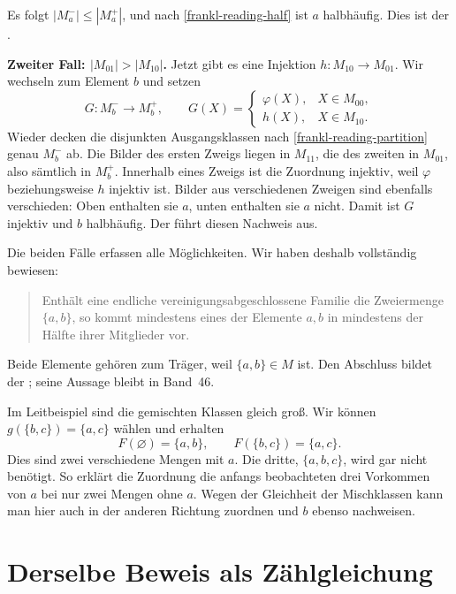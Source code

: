 Es folgt \(|M_a^-|\leq|M_a^+|\), und nach
\eqref{frankl-reading-half} ist \(a\) halbhäufig.
Dies ist der .

\medskip\noindent\textbf{Zweiter Fall: \(|M_{01}|>|M_{10}|\).}
Jetzt gibt es eine Injektion
\(h\colon M_{10}\to M_{01}\). Wir wechseln zum Element
\(b\) und setzen
\[
  G\colon M_b^-\longrightarrow M_b^+,
  \qquad
  G(X)=
  \begin{cases}
    \varphi(X),&X\in M_{00},\\
    h(X),&X\in M_{10}.
  \end{cases}
\]
Wieder decken die disjunkten Ausgangsklassen nach
\eqref{frankl-reading-partition} genau \(M_b^-\) ab.
Die Bilder des ersten Zweigs liegen in \(M_{11}\), die
des zweiten in \(M_{01}\), also sämtlich in \(M_b^+\).
Innerhalb eines Zweigs ist die Zuordnung injektiv, weil
\(\varphi\) beziehungsweise \(h\) injektiv ist.
Bilder aus verschiedenen Zweigen sind ebenfalls verschieden:
Oben enthalten sie \(a\), unten enthalten sie \(a\) nicht.
Damit ist \(G\) injektiv und \(b\) halbhäufig.
Der 
führt diesen Nachweis aus.

Die beiden Fälle erfassen alle Möglichkeiten. Wir haben
deshalb vollständig bewiesen:
\hypertarget{frankl.reading.pair}{}
\begin{quote}
  Enthält eine endliche vereinigungsabgeschlossene Familie
  die Zweiermenge \(\{a,b\}\), so kommt mindestens eines
  der Elemente \(a,b\) in mindestens der Hälfte ihrer
  Mitglieder vor.
\end{quote}
Beide Elemente gehören zum Träger, weil \(\{a,b\}\in M\)
ist. Den Abschluss bildet der
; seine Aussage bleibt in Band~46.

Im Leitbeispiel sind die gemischten Klassen gleich groß.
Wir können \(g(\{b,c\})=\{a,c\}\) wählen und erhalten
\[
  F(\varnothing)=\{a,b\},\qquad
  F(\{b,c\})=\{a,c\}.
\]
Dies sind zwei verschiedene Mengen mit \(a\). Die dritte,
\(\{a,b,c\}\), wird gar nicht benötigt. So erklärt die
Zuordnung die anfangs beobachteten drei Vorkommen von \(a\)
bei nur zwei Mengen ohne \(a\). Wegen der Gleichheit der
Mischklassen kann man hier auch in der anderen Richtung
zuordnen und \(b\) ebenso nachweisen.

\par{}
\section*{Derselbe Beweis als Zählgleichung}
\hypertarget{frankl.reading.counting}{}

